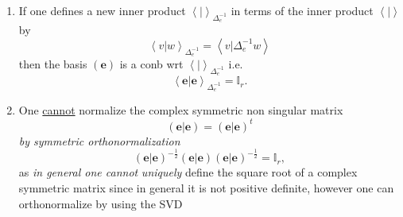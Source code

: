 \documentclass[aps,preprint]{revtex4}%
\begin{document}
\begin{enumerate}
\item If one defines a new inner product $\left\langle \left.  {}\right\vert
\right\rangle _{\Delta_{e}^{-1}}$ in terms of the inner product $\left\langle
\left.  {}\right\vert \right\rangle $ by
\begin{equation}
\left\langle \left.  v\right\vert w\right\rangle _{\Delta_{e}^{-1}%
}=\left\langle \left.  \overset{}{v}\right\vert \Delta_{e}^{-1}w\right\rangle
\end{equation}
then the basis $\left(  \mathbf{e}\right)  $ is a conb wrt $\left\langle
\left.  {}\right\vert \right\rangle _{\Delta_{e}^{-1}}$ i.e.
\begin{equation}
\left\langle \left.  \mathbf{e}\right\vert \mathbf{e}\right\rangle
_{\Delta_{e}^{-1}}=\mathbb{I}_{r}.
\end{equation}


\item One \underline{cannot} normalize the complex symmetric non singular
matrix
\[
\left(  \left.  \mathbf{e}\right\vert \mathbf{e}\right)  =\left(  \left.
\mathbf{e}\right\vert \mathbf{e}\right)  ^{t}%
\]
\emph{by symmetric orthonormalization}
\[
\left(  \left.  \mathbf{e}\right\vert \mathbf{e}\right)  ^{-\frac{1}{2}%
}\left(  \left.  \mathbf{e}\right\vert \mathbf{e}\right)  \left(  \left.
\mathbf{e}\right\vert \mathbf{e}\right)  ^{-\frac{1}{2}}=\mathbb{I}_{r},
\]
as \emph{in general one cannot} \emph{uniquely} define the square root of a
complex symmetric matrix since in general it is not positive definite, however
one can orthonormalize by using the SVD\ 


\end{enumerate}
\end{document}
